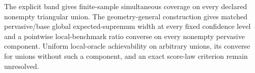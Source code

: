 The explicit band gives finite-sample simultaneous coverage on every declared nonempty triangular union. The geometry-general construction gives matched pervasive/base global expected-supremum width at every fixed confidence level and a pointwise local-benchmark ratio converse on every nonempty pervasive component. Uniform local-oracle achievability on arbitrary unions, its converse for unions without such a component, and an exact score-law criterion remain unresolved.